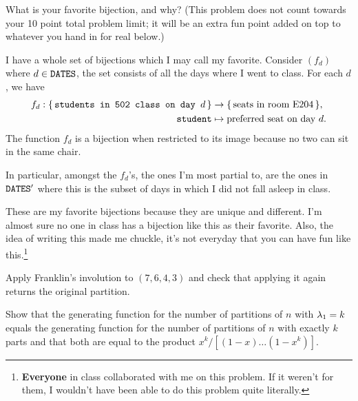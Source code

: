 \documentclass[12pt]{memoir}
\begin{document}
\begin{Ej}
What is your favorite bijection, and why? (This problem does not count towards your 10 point total problem limit; it will be an extra fun point added on top to whatever you hand in for real below.)
\end{Ej}

\begin{ptcbr}
I have a whole set of bijections which I may call my favorite. Consider $(f_d)$ where $d\in\texttt{DATES}$, the set  consists of all the days where I went to class. For each $d$, we have 
\begin{align*}
f_d:\{\,\texttt{students in 502 class on day }d\,\}&\to\{\,\text{seats in room E204}\,\},\\
\texttt{student}&\mapsto\text{preferred seat on day }d.    
\end{align*}
The function $f_d$ is a bijection when restricted to its image because no two  can sit in the same chair.\par
In particular, amongst the $f_d$'s, the ones I'm most partial to, are the ones in $\texttt{DATES}'$ where this is the subset of days in which I did not fall asleep in class.\par 
These are my favorite bijections because they are unique and different. I'm almost sure no one in class has a bijection like this as their favorite. Also, the idea of writing this made me chuckle, it's not everyday that you can have fun like this.\footnote{\textbf{Everyone} in class collaborated with me on this problem. If it weren't for them, I wouldn't have been able to do this problem quite literally.} 
\end{ptcbr}

\begin{Ej}[Exercise 2]
Apply Franklin's involution to $(7,6,4,3)$ and check that applying it again returns the original partition.
\end{Ej}


\begin{Ej}
Show that the generating function for the number of partitions of $n$ with $\lambda_1=k$ equals the generating function for the number of partitions of $n$ with exactly $k$ parts and that both are equal to the product $x^k/[(1-x)\dots(1-x^k)]$.
\end{Ej}
\end{document}
